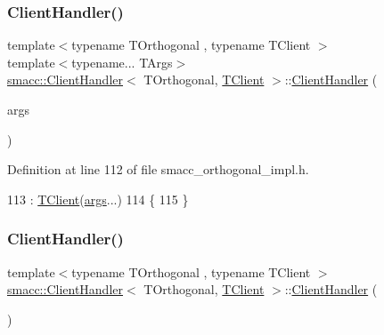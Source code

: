 \subsubsection{\texorpdfstring{Client\+Handler()}{ClientHandler()}\hspace{0.1cm}{\footnotesize\ttfamily [1/2]}}
{\footnotesize\ttfamily template$<$typename T\+Orthogonal , typename T\+Client $>$ \\
template$<$typename... T\+Args$>$ \\
\hyperlink{classsmacc_1_1ClientHandler}{smacc\+::\+Client\+Handler}$<$ T\+Orthogonal, \hyperlink{classTClient}{T\+Client} $>$\+::\hyperlink{classsmacc_1_1ClientHandler}{Client\+Handler} (\begin{DoxyParamCaption}\item[{T\+Args...}]{args }\end{DoxyParamCaption})\hspace{0.3cm}{\ttfamily [inline]}}



Definition at line 112 of file smacc\+\_\+orthogonal\+\_\+impl.\+h.


\begin{DoxyCode}
113         : \hyperlink{classTClient}{TClient}(\hyperlink{namespacegenerate__debs_a75f9143e38df82d83b2e8a6f99cae02c}{args}...)
114     \{
115     \}
\end{DoxyCode}
\mbox{\label{classsmacc_1_1ClientHandler_a73f354900b489edacad7ccb411c272da}} 
\subsubsection{\texorpdfstring{Client\+Handler()}{ClientHandler()}\hspace{0.1cm}{\footnotesize\ttfamily [2/2]}}
{\footnotesize\ttfamily template$<$typename T\+Orthogonal , typename T\+Client $>$ \\
\hyperlink{classsmacc_1_1ClientHandler}{smacc\+::\+Client\+Handler}$<$ T\+Orthogonal, \hyperlink{classTClient}{T\+Client} $>$\+::\hyperlink{classsmacc_1_1ClientHandler}{Client\+Handler} (\begin{DoxyParamCaption}{ }\end{DoxyParamCaption})\hspace{0.3cm}{\ttfamily [inline]}}



